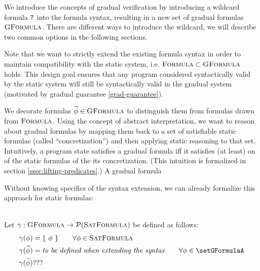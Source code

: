 
We introduce the concepts of gradual verification by introducing a wildcard formula $\texttt{?}$ into the formula syntax, resulting in a new set of gradual formulas $\textsc{GFormula}$.
There are different ways to introduce the wildcard, we will describe two common options in the following sections.

Note that we want to strictly extend the existing formula syntax in order to maintain compatibility with the static system, i.e. $\textsc{Formula} \subset \textsc{GFormula}$ holds.
This design goal ensures that any program considered syntactically valid by the static system will still be syntactically valid in the gradual system (motivated by gradual guarantee \ref{grad-guarantee}).

We decorate formulas $\widetilde{\phi} \in \textsc{GFormula}$ to distinguish them from formulas drawn from $\textsc{Formula}$.
Using the concept of abstract interpretation, we want to reason about gradual formulas by mapping them back to a set of satisfiable static formulas (called “concretization”) and then applying static reasoning to that set.
Intuitively, a program state satisfies a gradual formula iff it satisfies (at least) on of the static formulas of the its concretization.
(This intuition is formalized in section \ref{ssec:lifting-predicates}.)
A gradual formula


Without knowing specifics of the syntax extension, we can already formalize this approach for static formulas:
\begin{definition}[Concretization]~\\
    Let $\gamma : \textsc{GFormula} \rightarrow \mathcal{P}(\textsc{SatFormula})$ be defined as follows:
    \begin{align*}
    &\gamma(\phi) = \{~ \phi ~\}     \quad\quad \forall \phi \in \setFormulaA\\
    &\gamma(\grad{\phi}) = \textit{to be defined when extending the syntax}     \quad\quad \forall \phi \in \setGFormulaA\\
    &\gamma(\grad{\phi}) ???
    \end{align*}
\end{definition}

